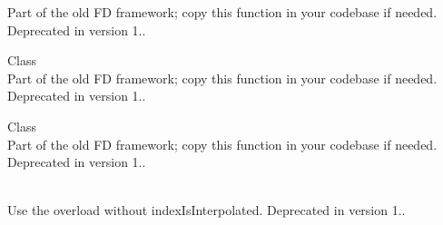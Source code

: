 \begin{DoxyRefList}
\label{deprecated__deprecated000113}%
%
Part of the old FD framework; copy this function in your codebase if needed. Deprecated in version 1..  
\item[Class \doxylink{class_quant_lib_1_1_pde_operator}{Quant\+Lib\+::Pde\+Operator\texorpdfstring{$<$}{<} Pde\+Class \texorpdfstring{$>$}{>}} ]\hfill \\
\label{deprecated__deprecated000115}%
%
Part of the old FD framework; copy this function in your codebase if needed. Deprecated in version 1..  
\item[Class \doxylink{class_quant_lib_1_1_pde_second_order_parabolic}{Quant\+Lib\+::Pde\+Second\+Order\+Parabolic} ]\hfill \\
\label{deprecated__deprecated000112}%
%
Part of the old FD framework; copy this function in your codebase if needed. Deprecated in version 1..  
\item[Member \doxylink{class_quant_lib_1_1_piecewise_yo_y_inflation_curve_a75c4549d497b4b255a55977188d38c49}{Quant\+Lib\+::Piecewise\+Yo\+YInflation\+Curve\texorpdfstring{$<$}{<} Interpolator, Bootstrap, Traits \texorpdfstring{$>$}{>}\+::Piecewise\+Yo\+YInflation\+Curve} (const \doxylink{class_quant_lib_1_1_date}{Date} \&reference\+Date, \doxylink{class_quant_lib_1_1_date}{Date} base\+Date, \doxylink{namespace_quant_lib_a919ba3567cc89fca373f8d6b8e80126b}{Rate} base\+Yo\+YRate, \doxylink{namespace_quant_lib_abfa020992bcf412e2bc99f56d4381b4a}{Frequency} frequency, bool index\+Is\+Interpolated, const \doxylink{class_quant_lib_1_1_day_counter}{Day\+Counter} \&day\+Counter, std\+::vector\texorpdfstring{$<$}{<} ext\+::shared\+\_\+ptr$<$ typename Traits\+::helper $>$ \texorpdfstring{$>$}{>} instruments, const ext\+::shared\+\_\+ptr$<$ Seasonality $>$ \&seasonality=\{\}, \doxylink{namespace_quant_lib_a372ac5c1a422a6b276fe0552d4d83f50}{Real} accuracy=1.\+0e-\/12, const Interpolator \&i=Interpolator())]\hfill \\
\label{deprecated__deprecated000129}%
%
Use the overload without index\+Is\+Interpolated. Deprecated in version 1..  

\end{DoxyRefList}
